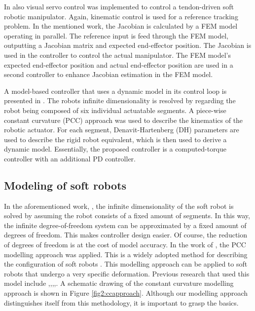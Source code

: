 In \cite{zhang2017visual} also visual servo control was implemented to control a tendon-driven soft robotic manipulator. Again, kinematic control is used for a reference tracking problem. In the mentioned work, the Jacobian is calculated by a FEM model operating in parallel. The reference input is feed through the FEM model, outputting a Jacobian matrix and expected end-effector position. The Jacobian is used in the controller to control the actual manipulator. The FEM model's expected end-effector position and actual end-effector position are used in a second controller to enhance Jacobian estimation in the FEM model.

A model-based controller that uses a dynamic model in its control loop is presented in \cite{della2020model}. The robots infinite dimensionality is resolved by regarding the robot being composed of six individual actuatable segments. A piece-wise constant curvature (PCC) approach was used to describe the kinematics of the robotic actuator. For each segment, Denavit-Hartenberg (DH) parameters are used to describe the rigid robot equivalent, which is then used to derive a dynamic model. Essentially, the proposed controller is a computed-torque controller with an additional PD controller. 

\subsection*{Modeling of soft robots}

In the aforementioned work, \cite{della2020model}, the infinite dimensionality of the soft robot is solved by assuming the robot consists of a fixed amount of segments. In this way, the infinite degree-of-freedom system can be approximated by a fixed amount of degrees of freedom. This makes controller design easier. Of course, the reduction of degrees of freedom is at the cost of model accuracy. In the work of \cite{della2020model}, the PCC modelling approach was applied. This is a widely adopted method for describing the configuration of soft robots \cite{ccapproach}. This modelling approach can be applied to soft robots that undergo a very specific deformation. Previous research that used this model include \cite{mahl2014bhakin},\cite{ccapproach},\cite{berkers},\cite{Falkenhahn2015},\cite{runge2017framework}. A schematic drawing of the constant curvature modelling approach is shown in Figure \ref{fig2:ccapproach}. Although our modelling approach distinguishes itself from this methodology, it is important to grasp the basics. 

